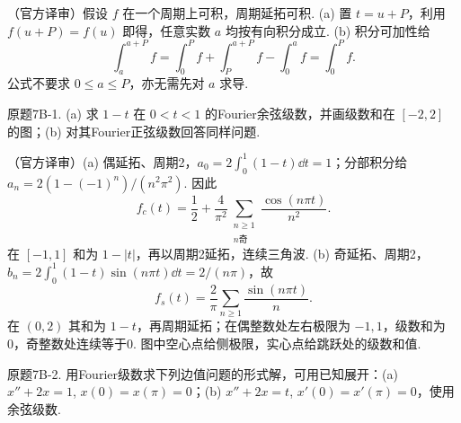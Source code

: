 \begin{solution}（官方译审）假设 $f$ 在一个周期上可积，周期延拓可积. (a) 置 $t=u+P$，利用 $f(u+P)=f(u)$ 即得，任意实数 $a$ 均按有向积分成立. (b) 积分可加性给
\[\int_a^{a+P}f=\int_0^Pf+\int_P^{a+P}f-\int_0^af=\int_0^Pf.\]
公式不要求 $0\le a\le P$，亦无需先对 $a$ 求导.\end{solution}
\begin{exercise}\label{cw:bank-7B-1}原题7B-1. (a) 求 $1-t$ 在 $0<t<1$ 的Fourier余弦级数，并画级数和在 $[-2,2]$ 的图；(b) 对其Fourier正弦级数回答同样问题.\end{exercise}
\begin{solution}（官方译审）(a) 偶延拓、周期2，$a_0=2\int_0^1(1-t)\dd t=1$；分部积分给 $a_n=2(1-(-1)^n)/(n^2\pi^2)$. 因此
\[f_c(t)=\frac12+\frac4{\pi^2}\sum_{\substack{n\ge1\\n\text{奇}}}\frac{\cos(n\pi t)}{n^2}.\]
在 $[-1,1]$ 和为 $1-|t|$，再以周期2延拓，连续三角波. (b) 奇延拓、周期2，$b_n=2\int_0^1(1-t)\sin(n\pi t)\dd t=2/(n\pi)$，故
\[f_s(t)=\frac2\pi\sum_{n\ge1}\frac{\sin(n\pi t)}n.\]
在 $(0,2)$ 其和为 $1-t$，再周期延拓；在偶整数处左右极限为 $-1,1$，级数和为0，奇整数处连续等于0. 图中空心点给侧极限，实心点给跳跃处的级数和值.
\begin{center}
\hfill
{}
\end{center}
\end{solution}
\begin{exercise}\label{cw:bank-7B-2}原题7B-2. 用Fourier级数求下列边值问题的形式解，可用已知展开：(a) $x''+2x=1$, $x(0)=x(\pi)=0$；(b) $x''+2x=t$, $x'(0)=x'(\pi)=0$，使用余弦级数.\end{exercise}
